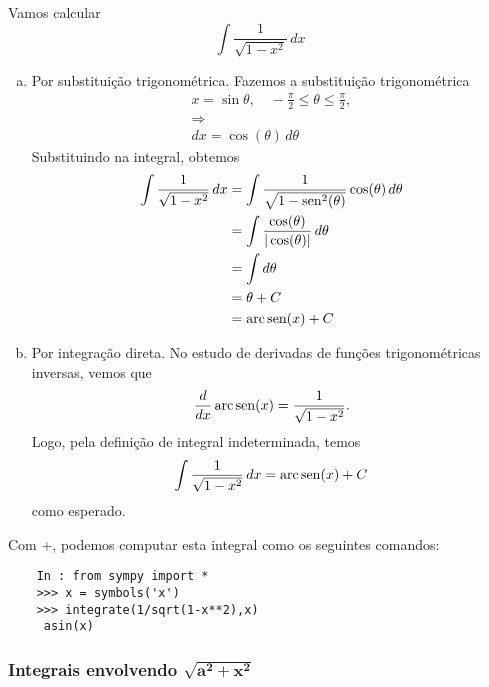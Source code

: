 \begin{ex}
  Vamos calcular
  \begin{equation}
    \int \frac{1}{\sqrt{1 - x^2}}\,dx
  \end{equation}
  \begin{enumerate}[a)]
  \item Por substituição trigonométrica.
    Fazemos a substituição trigonométrica
    \begin{gather}
      x = \sin\theta,\quad -\frac{\pi}{2}\leq\theta\leq\frac{\pi}{2},\\
      \Rightarrow\\
      dx = \cos(\theta)\,d\theta
    \end{gather}
    Substituindo na integral, obtemos
    \begin{align}
      \int \frac{1}{\sqrt{1 - x^2}}\,dx &= \int \frac{1}{\sqrt{1 - \operatorname{sen}^2(\theta)}}\cos(\theta)\,d\theta\\
                                        &= \int \frac{\cos(\theta)}{|\cos(\theta)|}\,d\theta\\
                                        &= \int d\theta\\
                                        &= \theta + C\\
                                        &= \operatorname{arc}\operatorname{sen}(x) + C
    \end{align}
  \item Por integração direta.
    No estudo de derivadas de funções trigonométricas inversas, vemos que
    \begin{equation}
      \frac{d}{dx}\operatorname{arc}\operatorname{sen}(x) = \frac{1}{\sqrt{1-x^2}}.
    \end{equation}
    Logo, pela definição de integral indeterminada, temos
    \begin{equation}
      \int\frac{1}{\sqrt{1-x^2}}\,dx = \operatorname{arc}\operatorname{sen}(x) + C
    \end{equation}
    como esperado.
  \end{enumerate}

  \ifispython
  Com {\python}+{\sympy}, podemos computar esta integral como os seguintes comandos:
  \begin{lstlisting}
    In : from sympy import *
    >>> x = symbols('x')
    >>> integrate(1/sqrt(1-x**2),x)
     asin(x)
  \end{lstlisting}
  \fi
\end{ex}

\subsubsection{Integrais envolvendo $\pmb{\sqrt{a^2 + x^2}}$}

